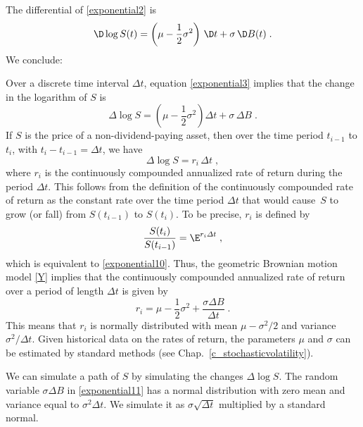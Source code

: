 The differential of \eqref{exponential2} is
\begin{equation}\label{exponential3}
\D \log S(t) = \left(\mu -\frac{1}{2}\sigma^2\right)\,\D t+ \sigma\,\D B(t)\;.
\end{equation}
We conclude:

\newpage
Over a discrete time interval $\varDelta t$, equation \eqref{exponential3} implies that the change in the logarithm of $S$ is 
\begin{equation}\label{exponential11}
\varDelta \log S = \left(\mu -\frac{1}{2}\sigma^2\right)\varDelta t+ \sigma\,\varDelta B\;.
\end{equation}
If $S$ is the price of a non-dividend-paying asset, then over the time period $t_{i-1}$ to $t_i$, with $t_i-t_{i-1}=\varDelta t$, we have
\begin{equation}\label{exponential10}
\varDelta \log S = r_i\,\varDelta t\;,
\end{equation}
where $r_i$ is the  continuously compounded annualized rate of return  during the period $\varDelta t$.  This follows from the definition of the continuously compounded rate of return as the constant rate over the time period $\varDelta t$ that would cause~$S$ to grow (or fall) from $S(t_{i-1})$ to $S(t_i)$.  To be precise, $r_i$ is defined by
$$\frac{S(t_i)}{S(t_{i-1})} = \E^{r_i\varDelta t}\; ,$$
which is equivalent to \eqref{exponential10}.
Thus, the geometric Brownian motion model \eqref{Y} implies that the continuously compounded annualized rate of return over a period of length $\varDelta t$ is given by
$$r_i = \mu -\frac{1}{2}\sigma^2+ \frac{\sigma\varDelta B}{\varDelta t}\; .$$
This means that $r_i$ is normally distributed with mean $\mu-\sigma^2/2$ and variance $\sigma^2/\varDelta t$.  Given historical data on the rates of return, the parameters $\mu$ and $\sigma$ can be estimated by standard methods (see Chap.~\ref{c_stochasticvolatility}).

We can simulate a path of $S$ by simulating the changes $\varDelta \log S$.  The random variable $\sigma \varDelta B$  in  \eqref{exponential11} has a normal distribution with zero mean and variance equal to $\sigma^2\varDelta t$.  We simulate it as $\sigma\sqrt{\varDelta t}$ multiplied by a standard normal.

